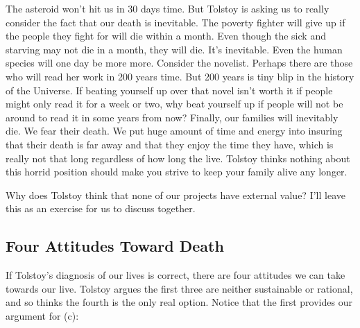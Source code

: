 \documentclass[9pt]{article}
\begin{document}
The asteroid won't hit us in 30 days time. But Tolstoy is asking us to
really consider the fact that our death is inevitable. The poverty
fighter will give up if the people they fight for will die within a
month. Even though the sick and starving may not die in a month, they
will die. It's inevitable. Even the human species will one day be more
more. Consider the novelist. Perhaps there are those who will read her
work in 200 years time. But 200 years is tiny blip in the history of the
Universe. If beating yourself up over that novel isn't worth it if
people might only read it for a week or two, why beat yourself up if
people will not be around to read it in some years from now? Finally,
our families will inevitably die. We fear their death. We put huge
amount of time and energy into insuring that their death is far away and
that they enjoy the time they have, which is really not that long
regardless of how long the live. Tolstoy thinks nothing about this
horrid position should make you strive to keep your family alive any
longer.

Why does Tolstoy think that none of our projects have external value?
I'll leave this as an exercise for us to discuss together.

\subsection{Four Attitudes Toward
Death}\label{four-attitudes-toward-death}

If Tolstoy's diagnosis of our lives is correct, there are four attitudes
we can take towards our live. Tolstoy argues the first three are neither
sustainable or rational, and so thinks the fourth is the only real
option. Notice that the first provides our argument for (c):
\end{document}
